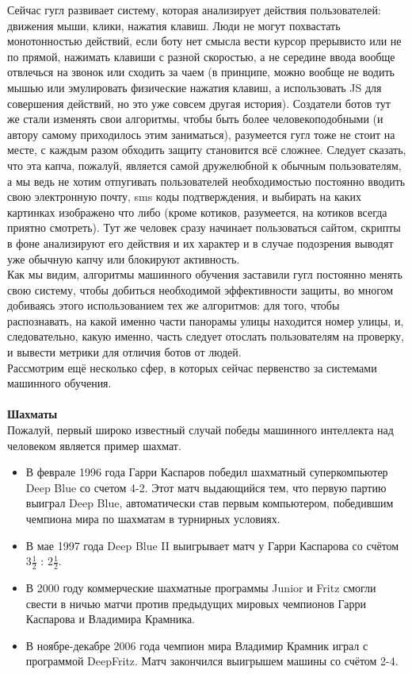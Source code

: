 Сейчас гугл развивает систему, которая анализирует действия пользователей: движения мыши, клики, нажатия клавиш. Люди не могут похвастать монотонностью действий, если боту нет смысла вести курсор прерывисто или не по прямой, нажимать клавиши с разной скоростью, а не середине ввода вообще отвлечься на звонок или сходить за чаем (в принципе, можно вообще не водить мышью или эмулировать физические нажатия клавиш, а использовать JS для совершения действий, но это уже совсем другая история). Создатели ботов тут же стали изменять свои алгоритмы, чтобы быть более человекоподобными (и автору самому приходилось этим заниматься), разумеется гугл тоже не стоит на месте, с каждым разом обходить защиту становится всё сложнее. Следует сказать, что эта капча, пожалуй, является самой дружелюбной к обычным пользователям, а мы ведь не хотим отпугивать пользователей необходимостью постоянно вводить свою электронную почту, sms коды подтверждения, и выбирать на каких картинках изображено что либо (кроме котиков, разумеется, на котиков всегда приятно смотреть). Тут же человек сразу начинает пользоваться сайтом, скрипты в фоне анализируют его действия и их характер и в случае подозрения выводят уже обычную капчу или блокируют активность.\\

Как мы видим, алгоритмы машинного обучения заставили гугл постоянно менять свою систему, чтобы добиться необходимой эффективности защиты, во многом добиваясь этого использованием тех же алгоритмов: для того, чтобы распознавать, на какой именно части панорамы улицы находится номер улицы, и, следовательно, какую именно, часть следует отослать пользователям на проверку, и вывести метрики для отличия ботов от людей.\\

Рассмотрим ещё несколько сфер, в которых сейчас первенство за системами машинного обучения.\\\\

\textbf{Шахматы}\\
Пожалуй, первый широко известный случай победы машинного интеллекта над человеком является пример шахмат.\\
\begin{itemize}
    \item В феврале 1996 года Гарри Каспаров победил шахматный суперкомпьютер Deep Blue со счетом 4-2. Этот матч выдающийся тем, что первую партию выиграл Deep Blue, автоматически став первым компьютером, победившим чемпиона мира по шахматам в турнирных условиях.
    \item В мае 1997 года Deep Blue II выигрывает матч у Гарри Каспарова со счётом $3\frac{1}{2}$ : $2\frac{1}{2}$.
    \item В 2000 году коммерческие шахматные программы Junior и Fritz смогли свести в ничью матчи против предыдущих мировых чемпионов Гарри Каспарова и Владимира Крамника.
    \item В ноябре-декабре 2006 года чемпион мира Владимир Крамник играл с программой DeepFritz. Матч закончился выигрышем машины со счётом 2-4.\\
\end{itemize}

